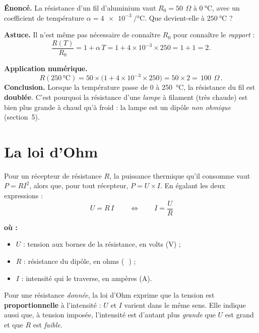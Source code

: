 \documentclass[11pt,a4paper]{article}
\newenvironment{ou}{%
  \par\smallskip\noindent\textbf{où :}\nopagebreak
  \begin{itemize}[leftmargin=1.8em,topsep=2pt,itemsep=1.5pt,parsep=0pt]}%
  {\end{itemize}}
\newcommand{\ohm}{\,\Omega}
\begin{document}
\begin{exemple}
\textbf{Énoncé.} La résistance d'un fil d'aluminium vaut $R_0=\SI{50}{\ohm}$ à $\SI{0}{\degreeCelsius}$,
avec un coefficient de température $\alpha=\SI{4e-3}{\per\degreeCelsius}$. Que devient-elle à
$\SI{250}{\degreeCelsius}$ ?

\smallskip
\textbf{Astuce.} Il n'est même pas nécessaire de connaître $R_0$ pour connaître le \emph{rapport} :
\[ \frac{R(T)}{R_0} = 1 + \alpha\,T = 1 + 4\times10^{-3}\times 250 = 1 + 1 = 2. \]

\textbf{Application numérique.}
\[ R(250\,\si{\degreeCelsius}) = 50 \times \bigl(1 + 4\times10^{-3}\times 250\bigr)
   = 50 \times 2 = \boxed{\,\SI{100}{\ohm}\,}. \]
\textbf{Conclusion.} Lorsque la température passe de \SI{0}{} à \SI{250}{\degreeCelsius}, la résistance
du fil est \textbf{doublée}. C'est pourquoi la résistance d'une \emph{lampe} à filament (très chaude)
est bien plus grande à chaud qu'à froid : la lampe est un dipôle \emph{non ohmique} (section~5).
\end{exemple}

\section{La loi d'Ohm}
\begin{formule}
Pour un récepteur de résistance $R$, la puissance thermique qu'il consomme vaut $P=RI^2$, alors que,
pour tout récepteur, $P=U\times I$. En égalant les deux expressions :
\[ \boxed{\,U = R\,I\,} \qquad\Longleftrightarrow\qquad I = \dfrac{U}{R} \]
\begin{ou}
  \item $U$ : tension aux bornes de la résistance, en volts (\si{\volt}) ;
  \item $R$ : résistance du dipôle, en ohms (\si{\ohm}) ;
  \item $I$ : intensité qui le traverse, en ampères (\si{\ampere}).
\end{ou}
\end{formule}

\begin{remarque}
Pour une résistance \emph{donnée}, la loi d'Ohm exprime que la tension est \textbf{proportionnelle} à
l'intensité : $U$ et $I$ varient dans le même sens. Elle indique aussi que, à tension imposée,
l'intensité est d'autant plus \emph{grande} que $U$ est grand et que $R$ est \emph{faible}.
\end{remarque}
\end{document}
